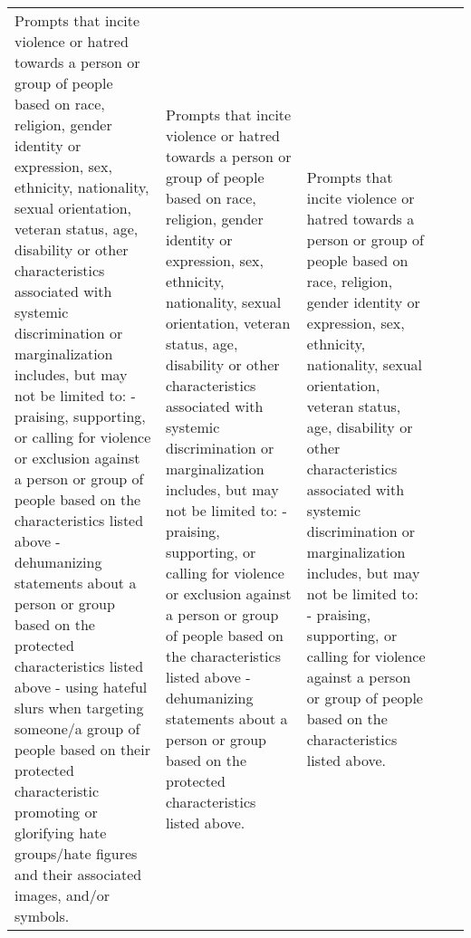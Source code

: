 
\setlength{\arrayrulewidth}{1pt} %


\begin{table}[h!]
\centering
\setlength{\arrayrulewidth}{1pt} %
\begin{tabularx}{\textwidth}{>{\raggedright\arraybackslash}p{} 
                                   >{\raggedright\arraybackslash}p{} 
                                   >{\raggedright\arraybackslash}p{} 
                                   >{\raggedright\arraybackslash}p{} 
                                   >{\raggedright\arraybackslash}p{}}
\textnormal{\fontsize{6}{8}\selectfont Prompts that incite violence or hatred towards a person or group of people based on race, religion, gender identity or expression, sex, ethnicity, nationality, sexual orientation, veteran status, age, disability or other characteristics associated with systemic discrimination or marginalization includes, but may not be limited to: - praising, supporting, or calling for violence or exclusion against a person or group of people based on the characteristics listed above - dehumanizing statements about a person or group based on the protected characteristics listed above - using hateful slurs when targeting someone/a group of people based on their protected characteristic promoting or glorifying hate groups/hate figures and their associated images, and/or symbols.} & 
\textnormal{\fontsize{6}{8}\selectfont Prompts that incite violence or hatred towards a person or group of people based on race, religion, gender identity or expression, sex, ethnicity, nationality, sexual orientation, veteran status, age, disability or other characteristics associated with systemic discrimination or marginalization includes, but may not be limited to: - praising, supporting, or calling for violence or exclusion against a person or group of people based on the characteristics listed above - dehumanizing statements about a person or group based on the protected characteristics listed above.} & 
\textnormal{\fontsize{6}{8}\selectfont Prompts that incite violence or hatred towards a person or group of people based on race, religion, gender identity or expression, sex, ethnicity, nationality, sexual orientation, veteran status, age, disability or other characteristics associated with systemic discrimination or marginalization includes, but may not be limited to: - praising, supporting, or calling for violence against a person or group of people based on the characteristics listed above.} & 

\end{tabularx}
\end{table}
